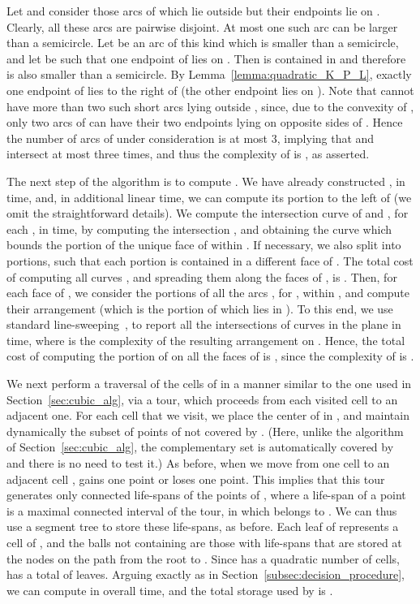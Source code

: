 \documentclass[a4paper,12pt]{article}
\begin{document}
Let  and consider those arcs of  which lie outside  but their endpoints lie on . Clearly, all these arcs are pairwise disjoint. At most one such arc can be larger than a semicircle. Let  be an arc of this kind which is smaller than a semicircle, and let  be such that one endpoint of  lies on . Then  is contained in  and therefore is also smaller than a semicircle. By Lemma~\ref{lemma:quadratic_K_P_L}, exactly one endpoint of  lies to the right of  (the other endpoint lies on ).
Note that  cannot have more than two such short arcs lying outside , since, due to the convexity of , only two arcs of  can have their two endpoints lying on opposite sides of . Hence the number of arcs of  under consideration is at most 3, implying that  and  intersect at most three times, and thus the complexity of  is , as asserted.

\smallskip
{} The next step of the
algorithm is to compute . We have already constructed
, in  time, and, in additional linear
time, we can compute its portion  to the left of 
(we omit the straightforward details). We compute the intersection
curve  of  and , for each ,
in  time, by computing the intersection , and obtaining the curve which bounds the portion of the
unique face of  within . If
necessary, we also split  into portions, such that each
portion is contained in a different face of . The total
cost of computing all curves , and
spreading them along the faces of , is .
Then, for each face  of , we consider the portions of
all the arcs , for , within , and compute
their arrangement (which is the portion of  which lies in ).
To this end, we use standard line-sweeping~\cite{book}, to report
all the intersections of  curves in the plane in  time, where  is the complexity of the resulting
arrangement on . Hence, the total cost of computing the portion
of  on all the faces of  is , since the complexity of  is
.

We next perform a traversal of the cells of  in a manner similar to the one used in Section~\ref{sec:cubic_alg}, via a tour, which proceeds from each visited cell to an adjacent one. For each cell  that we visit, we place
the center  of  in , and maintain dynamically the subset
 of points of  not covered by . (Here, unlike the algorithm of Section~\ref{sec:cubic_alg}, the complementary set   is automatically covered by  and there is no need to test it.) As before,
when we move
from one cell  to an adjacent cell ,  gains
one point or loses one point. This implies that this tour generates only  connected life-spans of the points of , where a life-span of a point  is a maximal connected interval of the tour, in which  belongs to . We can thus use a segment tree  to store these life-spans, as before. Each
leaf  of  represents a cell  of , and the balls not containing  are those with life-spans that are stored at the nodes on the path from the root to . Since  has a quadratic number of
cells,  has a total
of  leaves. Arguing exactly as in Section~\ref{subsec:decision_procedure}, we can compute  in overall  time, and the total storage used by  is .
\end{document}
